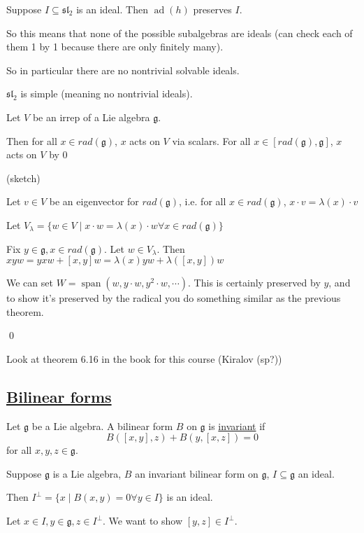 \documentclass[x11names,reqno,14pt]{extarticle}
\newcommand{\mk}[1]{\mathfrak{#1}}
\newcommand{\g}{\mk{g}}
\newcommand{\rad}{rad}
\DeclareMathOperator{\ad}{ad}
\renewcommand{\sl}{\mk{s}\mk{l}}
\DeclareMathOperator{\Span}{span}
\begin{document}
Suppose $I \subseteq \sl_2$ is an ideal. Then $\ad(h)$ preserves $I$. 

So this means that none of the possible subalgebras are ideals (can check each of them 1 by 1 because there are only finitely many). 

So in particular there are no nontrivial solvable ideals. 

\cor

$\sl_2$ is simple (meaning no nontrivial ideals). 

\thm

Let $V$ be an irrep of a Lie algebra $\g$. 

Then for all $x \in \rad(\g)$, $x$ acts on $V$ via scalars. For all $x \in [\rad(\g),\g]$, $x$ acts on $V$ by 0

\proof(sketch)

Let $v \in V$ be an eigenvector for $\rad(\g)$, i.e. for all $x \in \rad(\g)$, $x\cdot v = \lambda(x)\cdot v$

Let $V_\lambda = \{w\in V \mid x\cdot w = \lambda(x)\cdot w\forall x \in \rad(\g)\}$

Fix $y \in \g, x \in \rad(\g)$. Let $w \in V_\lambda$. Then $xyw = yxw + [x,y]w = \lambda(x)yw + \lambda([x,y])w$

We can set $W = \Span(w,y\cdot w, y^2\cdot w, \cdots)$. This is certainly preserved by $y$, and to show it's preserved by the radical you do something similar as the previous theorem.

\qed

Look at theorem 6.16 in the book for this course (Kiralov (sp?))

\subsection*{\underline{Bilinear forms}}


Let $\g$ be a Lie algebra. A bilinear form $B$ on $\g$ is \underline{invariant} if 
\[
B([x,y],z) + B(y,[x,z]) = 0
\]
for all $x, y, z \in \g$.

\prop

Suppose $\g$ is a Lie algebra, $B$ an invariant bilinear form on $\g$, $I \subseteq \g$ an ideal. 

Then $I^\perp = \{x \mid B(x,y) = 0 \forall y \in I\}$ is an ideal. 

\proof

Let $x \in I, y \in \g, z \in I^\perp$. We want to show $[y,z] \in I^\perp$.
\end{document}
